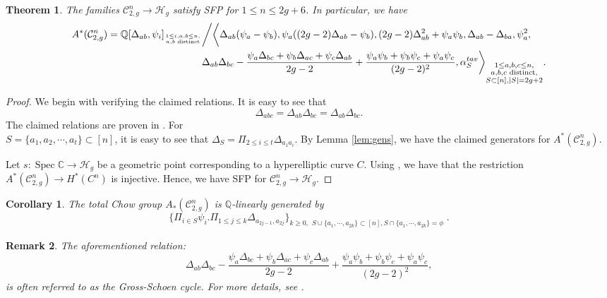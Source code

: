 \documentclass[11pt]{amsart}
\newtheorem{theorem}{Theorem}[section]
\newtheorem{corollary}{Corollary}[theorem]
\newtheorem{rem}[theorem]{Remark}
\theoremstyle{definition}
\newcommand{\ri}{\rightarrow}
\newcommand{\h}{\mathcal{H}}
\newcommand{\Q}{\mathbb{Q}}
\newcommand{\mC}{\mathcal{C}}
\newcommand{\spec}{\operatorname{Spec}}
\begin{document}
\begin{theorem}\label{thm:c-powers}
The families $\mC_{2,g}^n\ri\h_g$ satisfy SFP for $1\leq n\leq 2g+6$. In particular, we have
  \begin{equation*} \begin{aligned}A^*(\mC_{2,g}^n) = \mathbb{Q}[\Delta_{ab},\psi_i]_{1\leq i,a,b\leq n,\atop a,b \text{ distinct}} & \bigg / \bigg \langle \Delta_{ab}(\psi_a-\psi_b),\psi_a((2g-2)\Delta_{ab}-\psi_b),
  (2g-2)\Delta_{ab}^2+\psi_a\psi_b,\Delta_{ab}-\Delta_{ba},\psi_a^2, \\ & \Delta_{ab}\Delta_{bc} - \dfrac{\psi_a\Delta_{bc}+\psi_b\Delta_{ac}+\psi_c\Delta_{ab}}{2g-2}+\dfrac{\psi_a\psi_b+\psi_b\psi_c+\psi_a\psi_c}{(2g-2)^2},\alpha_S^{tav}\bigg\rangle _{\substack{1\leq a,b,c\leq n ,\\ a,b,c \text{ distinct} , \\ S\subset [n],|S|=2g+2}}.
\end{aligned}
\end{equation*}
\end{theorem}
\begin{proof}
We begin with verifying the claimed relations. It is easy to see that 
$$\Delta_{abc} = \Delta_{ab}\Delta_{bc} = \Delta_{ab}\Delta_{bc}.$$
The claimed relations are proven in \cite[Theorem 3.10 - Corollary 3.3]{mehdi}.
For\\ $S=\{a_1,a_2,\cdots,a_t\}\subset[n]$, it is easy to see that $\Delta_S = \Pi_{2\leq i\leq t}\Delta_{a_1a_i}$.
By Lemma \ref{lem:gens}, we have the claimed generators for $A^*(\mC_{2,g}^n)$. 

Let $s:\spec \mathbb{C}\ri \h_g$ be a geometric point corresponding to a hyperelliptic curve $C$. Using \cite[Propostion 3.16 - Corollary 3.18]{mehdi}, we have that the restriction $A^*(\mC_{2,g}^n)\ri H^*(C^n)$ is injective. Hence, we have SFP for $\mC_{2,g}^n\ri \h_g$.
\end{proof}
\begin{corollary}\label{cor:c-powers}
    The total Chow group $A_*(\mC_{2,g}^n)$ is $\Q$-linearly generated by $$\{\Pi_{i\in S} \psi_i.\Pi_{1\le j\leq k} \Delta_{a_{2j-1},a_{2j}}\}_{k\geq 0,\substack{S\cup\{a_1,\cdots,a_{2k}\}\subset [n],S\cap\{a_1,\cdots,a_{2k}\}=\phi}}.$$
\end{corollary}
\begin{rem} \label{Gross-Schoen}
    The aforementioned relation:
	$$\Delta_{ab}\Delta_{bc} - \dfrac{\psi_a\Delta_{bc}+\psi_b\Delta_{ac}+\psi_c\Delta_{ab}}{2g-2}+\dfrac{\psi_a\psi_b+\psi_b\psi_c+\psi_a\psi_c}{(2g-2)^2},$$
	 is often referred to as the \textit{Gross-Schoen} cycle. For more details, see \cite{schoen,zhang-gs}.
\end{rem}
\end{document}
